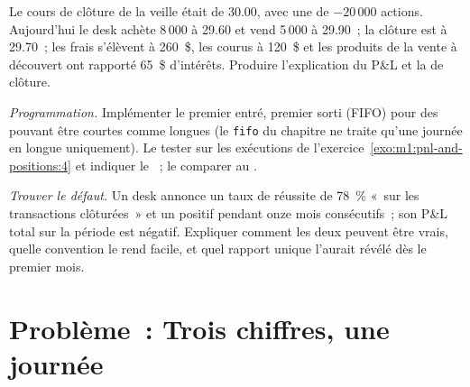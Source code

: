 \begin{exercise}[$\star\star$]\label{exo:m1:pnl-and-positions:6}
Le cours de clôture de la veille était de 30.00, avec une  de $-20\,000$ actions. Aujourd'hui le
desk achète 8\,000 à 29.60 et vend 5\,000 à 29.90~; la clôture est à 29.70~; les frais
s'élèvent à 260~\$, les  courus à 120~\$ et les produits de la vente à découvert
ont rapporté 65~\$ d'intérêts. Produire l'explication du P\&L et la  de clôture.
\end{exercise}

\begin{exercise}[$\star\star\star$]\label{exo:m1:pnl-and-positions:7}
\emph{Programmation.} Implémenter le premier entré, premier sorti (FIFO) pour des  pouvant être
courtes comme longues (le \texttt{fifo} du chapitre ne traite qu'une journée en  longue uniquement). Le tester
sur les exécutions de l'exercice~\ref{exo:m1:pnl-and-positions:4} et indiquer le
~; le comparer au .
\end{exercise}

\begin{exercise}[$\star\star\star$]\label{exo:m1:pnl-and-positions:8}
\emph{Trouver le défaut.} Un desk annonce un taux de réussite de 78~\% «~sur les transactions clôturées~»
et un  positif pendant onze mois consécutifs~; son P\&L total
sur la période est négatif. Expliquer comment les deux peuvent être vrais, quelle convention
le rend facile, et quel rapport unique l'aurait révélé dès le premier
mois.
\end{exercise}

\section{Problème~: Trois chiffres, une journée}

